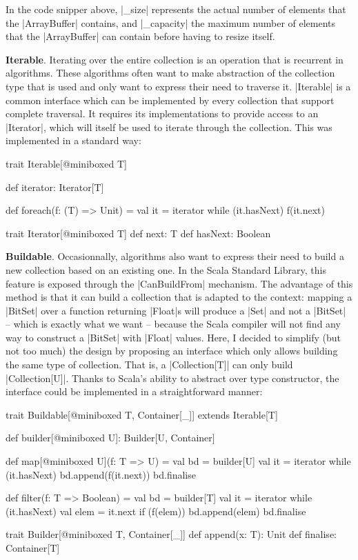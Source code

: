In the code snipper above, |_size| represents the actual number of elements that the |ArrayBuffer| contains, and |_capacity| the maximum number of elements that the |ArrayBuffer| can contain before having to resize itself.
 
\textbf{Iterable}. Iterating over the entire collection is an operation that is recurrent in algorithms. These algorithms often want to make abstraction of the collection type that is used and only want to express their need to traverse it. |Iterable| is a common interface which can be implemented by every collection that support complete traversal. It requires its implementations to provide access to an |Iterator|, which will itself be used to iterate through the collection. This was implemented in a standard way:

\begin{lstlisting-nobreak}
trait Iterable[@miniboxed T] {
  def iterator: Iterator[T]

  def foreach(f: (T) => Unit) = {
    val it = iterator
    while (it.hasNext) {
      f(it.next)
    }
  }
}

trait Iterator[@miniboxed T] {
  def next: T
  def hasNext: Boolean
}
\end{lstlisting-nobreak}

\textbf{Buildable}. Occasionnally, algorithms also want to express their need to build a new collection based on an existing one. In the Scala Standard Library, this feature is exposed through the |CanBuildFrom| mechanism. The advantage of this method is that it can build a collection that is adapted to the context: mapping a |BitSet| over a function returning |Float|s will produce a |Set| and not a |BitSet| -- which is exactly what we want -- because the Scala compiler will not find any way to construct a |BitSet| with |Float| values. Here, I decided to simplify (but not too much) the design by proposing an interface which only allows building the same type of collection. That is, a |Collection[T]| can only build |Collection[U]|. Thanks to Scala's ability to abstract over type constructor, the interface could be implemented in a straightforward manner: 

\begin{lstlisting-nobreak}
trait Buildable[@miniboxed T, Container[_]] extends Iterable[T] {
  def builder[@miniboxed U]: Builder[U, Container]

  def map[@miniboxed U](f: T => U) = {
    val bd = builder[U]
    val it = iterator
    while (it.hasNext) {
      bd.append(f(it.next))
    }
    bd.finalise
  }

  def filter(f: T => Boolean) = {
    val bd = builder[T]
    val it = iterator
    while (it.hasNext) {
      val elem = it.next
      if (f(elem)) {
        bd.append(elem)
      }
    }
    bd.finalise
  }
}

trait Builder[@miniboxed T, Container[_]] {
  def append(x: T): Unit
  def finalise: Container[T]
}
\end{lstlisting-nobreak}

